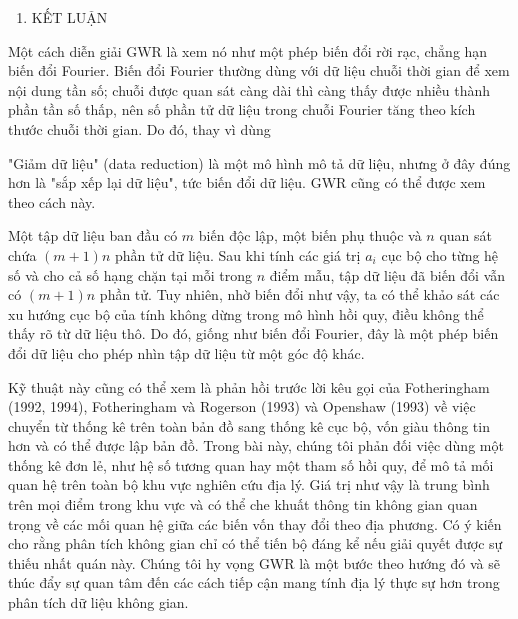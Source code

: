 \begin{enumerate}
\def\labelenumi{\arabic{enumi}.}
\setcounter{enumi}{5}
\item
  KẾT LUẬN
\end{enumerate}

Một cách diễn giải GWR là xem nó như một phép biến đổi rời rạc, chẳng hạn biến đổi Fourier. Biến đổi Fourier thường dùng với dữ liệu chuỗi thời gian để xem nội dung tần số; chuỗi được quan sát càng dài thì càng thấy được nhiều thành phần tần số thấp, nên số phần tử dữ liệu trong chuỗi Fourier tăng theo kích thước chuỗi thời gian. Do đó, thay vì dùng

"Giảm dữ liệu" (data reduction) là một mô hình mô tả dữ liệu, nhưng ở đây đúng hơn là "sắp xếp lại dữ liệu", tức biến đổi dữ liệu. GWR cũng có thể được xem theo cách này.

Một tập dữ liệu ban đầu có \(m\) biến độc lập, một biến phụ thuộc và \(n\) quan sát chứa \((m+1)n\) phần tử dữ liệu. Sau khi tính các giá trị \(a_i\) cục bộ cho từng hệ số và cho cả số hạng chặn tại mỗi trong \(n\) điểm mẫu, tập dữ liệu đã biến đổi vẫn có \((m+1)n\) phần tử. Tuy nhiên, nhờ biến đổi như vậy, ta có thể khảo sát các xu hướng cục bộ của tính không dừng trong mô hình hồi quy, điều không thể thấy rõ từ dữ liệu thô. Do đó, giống như biến đổi Fourier, đây là một phép biến đổi dữ liệu cho phép nhìn tập dữ liệu từ một góc độ khác.

Kỹ thuật này cũng có thể xem là phản hồi trước lời kêu gọi của Fotheringham (1992, 1994), Fotheringham và Rogerson (1993) và Openshaw (1993) về việc chuyển từ thống kê trên toàn bản đồ sang thống kê cục bộ, vốn giàu thông tin hơn và có thể được lập bản đồ. Trong bài này, chúng tôi phản đối việc dùng một thống kê đơn lẻ, như hệ số tương quan hay một tham số hồi quy, để mô tả mối quan hệ trên toàn bộ khu vực nghiên cứu địa lý. Giá trị như vậy là trung bình trên mọi điểm trong khu vực và có thể che khuất thông tin không gian quan trọng về các mối quan hệ giữa các biến vốn thay đổi theo địa phương. Có ý kiến cho rằng phân tích không gian chỉ có thể tiến bộ đáng kể nếu giải quyết được sự thiếu nhất quán này. Chúng tôi hy vọng GWR là một bước theo hướng đó và sẽ thúc đẩy sự quan tâm đến các cách tiếp cận mang tính địa lý thực sự hơn trong phân tích dữ liệu không gian.
